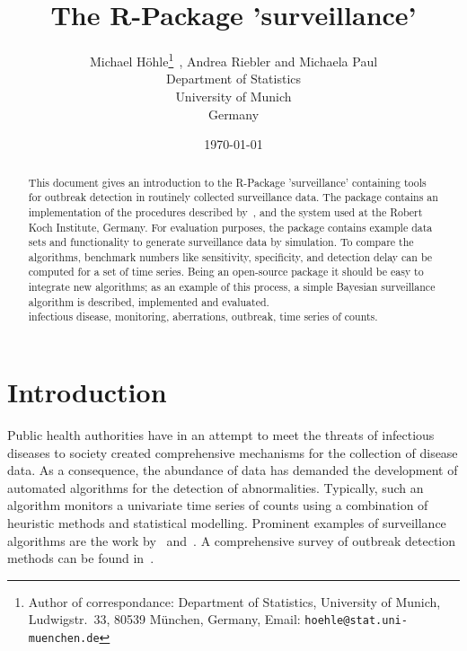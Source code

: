 \documentclass[a4paper,11pt]{article}
\title{The R-Package 'surveillance'}
\author{
Michael H{\"o}hle\thanks{Author of correspondance: Department of Statistics, University of Munich, Ludwigstr.\ 33, 80539 M{\"u}nchen, Germany, Email: \texttt{hoehle@stat.uni-muenchen.de}}$\>\>$, Andrea Riebler and Michaela Paul\\
Department of Statistics\\
University of Munich\\
Germany } \date{\today}
\begin{document}






\maketitle  

\begin{abstract}
  \noindent This document gives an introduction to the R-Package
  'surveillance' containing tools for outbreak detection in routinely
  collected surveillance data. The package contains an implementation
  of the procedures described by~\citet{stroup89},
  \citet{farrington96} and the system used at the Robert Koch
  Institute, Germany. For evaluation purposes, the package contains
  example data sets and functionality to generate surveillance data by
  simulation. To compare the algorithms, benchmark numbers like
  sensitivity, specificity, and detection delay can be computed for a
  set of time series. Being an open-source package it should be easy
  to integrate new algorithms; as an example of this process, a
  simple Bayesian surveillance algorithm is described, implemented and evaluated.\\

   infectious disease, monitoring, aberrations, 
  outbreak, time series of counts.
\end{abstract}


\section{Introduction}\label{sec:intro}
Public health authorities have in an attempt to meet the threats of
infectious diseases to society created comprehensive mechanisms for
the collection of disease data. As a consequence, the abundance of
data has demanded the development of automated algorithms for the
detection of abnormalities. Typically, such an algorithm monitors a
univariate time series of counts using a combination of heuristic
methods and statistical modelling.  Prominent examples of surveillance
algorithms are the work by~\citet{stroup89} and~\citet{farrington96}.
A comprehensive survey of outbreak detection methods can be found
in~\citep{farrington2003}.
\end{document}
